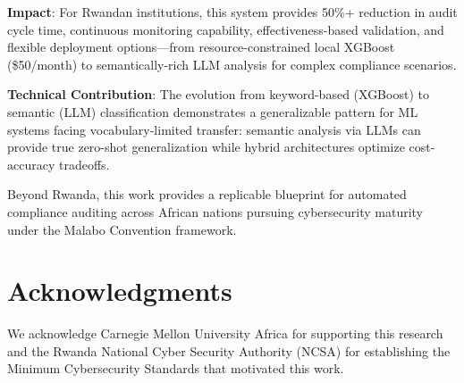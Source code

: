 \documentclass[11pt,conference]{IEEEtran}
\begin{document}
\textbf{Impact}: For Rwandan institutions, this system provides 50\%+ reduction in audit cycle time, continuous monitoring capability, effectiveness-based validation, and flexible deployment options---from resource-constrained local XGBoost (\$50/month) to semantically-rich LLM analysis for complex compliance scenarios.

\textbf{Technical Contribution}: The evolution from keyword-based (XGBoost) to semantic (LLM) classification demonstrates a generalizable pattern for ML systems facing vocabulary-limited transfer: semantic analysis via LLMs can provide true zero-shot generalization while hybrid architectures optimize cost-accuracy tradeoffs.

Beyond Rwanda, this work provides a replicable blueprint for automated compliance auditing across African nations pursuing cybersecurity maturity under the Malabo Convention framework.

\section*{Acknowledgments}

We acknowledge Carnegie Mellon University Africa for supporting this research and the Rwanda National Cyber Security Authority (NCSA) for establishing the Minimum Cybersecurity Standards that motivated this work.
\end{document}
